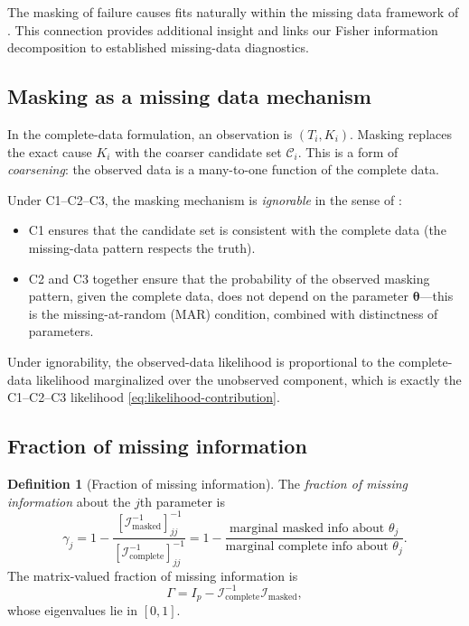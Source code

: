 \documentclass[11pt]{article}
\theoremstyle{definition}
\newtheorem{definition}{Definition}
\theoremstyle{plain}
\renewcommand{\v}[1]{\boldsymbol{#1}}
\newcommand{\btheta}{\v{\theta}}
\newcommand{\FI}{\mathcal{I}}       %
\begin{document}
The masking of failure causes fits naturally within the missing data
framework of \citet{little2002}.
This connection provides additional insight and links our Fisher
information decomposition to established missing-data diagnostics.

\subsection{Masking as a missing data mechanism}

In the complete-data formulation, an observation is $(T_i, K_i)$.
Masking replaces the exact cause $K_i$ with the coarser candidate
set $\mathcal{C}_i$.
This is a form of \emph{coarsening}: the observed data is a
many-to-one function of the complete data.

Under C1--C2--C3, the masking mechanism is \emph{ignorable} in the
sense of \citet{little2002}:
\begin{itemize}[nosep]
    \item C1 ensures that the candidate set is consistent with the
    complete data (the missing-data pattern respects the truth).
    \item C2 and C3 together ensure that the probability of the
    observed masking pattern, given the complete data, does not depend
    on the parameter $\btheta$---this is the missing-at-random (MAR)
    condition, combined with distinctness of parameters.
\end{itemize}
Under ignorability, the observed-data likelihood is proportional to
the complete-data likelihood marginalized over the unobserved
component, which is exactly the C1--C2--C3 likelihood
\eqref{eq:likelihood-contribution}.

\subsection{Fraction of missing information}

\begin{definition}[Fraction of missing information]
\label{def:fmi}
The \emph{fraction of missing information} about the $j$th parameter
is
\begin{equation}
\label{eq:fmi}
    \gamma_j
    = 1 - \frac{[\FI_{\mathrm{masked}}^{-1}]_{jj}^{-1}}
               {[\FI_{\mathrm{complete}}^{-1}]_{jj}^{-1}}
    = 1 - \frac{\text{marginal masked info about } \theta_j}
               {\text{marginal complete info about } \theta_j}.
\end{equation}
The matrix-valued fraction of missing information is
\begin{equation}
    \Gamma = I_p - \FI_{\mathrm{complete}}^{-1} \FI_{\mathrm{masked}},
\end{equation}
whose eigenvalues lie in $[0, 1]$.
\end{definition}
\end{document}
